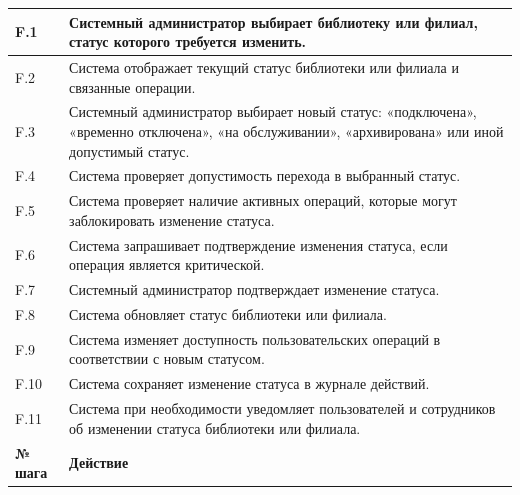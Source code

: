 \documentclass[12pt,a4paper]{article}
\begin{document}
\begin{xltabular}{\textwidth}{
				|>{\raggedright\arraybackslash}p{2.7cm}
				|>{\raggedright\arraybackslash}X|
			}
			F.1 & Системный администратор выбирает библиотеку или филиал, статус
			которого требуется изменить. \\
			\hline
			F.2 & Система отображает текущий статус библиотеки или филиала и связанные
			операции. \\
			\hline
			F.3 & Системный администратор выбирает новый статус: «подключена»,
			«временно отключена», «на обслуживании», «архивирована» или иной
			допустимый статус. \\
			\hline
			F.4 & Система проверяет допустимость перехода в выбранный статус. \\
			\hline
			F.5 & Система проверяет наличие активных операций, которые могут
			заблокировать изменение статуса. \\
			\hline
			F.6 & Система запрашивает подтверждение изменения статуса, если операция
			является критической. \\
			\hline
			F.7 & Системный администратор подтверждает изменение статуса. \\
			\hline
			F.8 & Система обновляет статус библиотеки или филиала. \\
			\hline
			F.9 & Система изменяет доступность пользовательских операций в соответствии
			с новым статусом. \\
			\hline
			F.10 & Система сохраняет изменение статуса в журнале действий. \\
			\hline
			F.11 & Система при необходимости уведомляет пользователей и сотрудников об
			изменении статуса библиотеки или филиала. \\
			\hline
			
			
			\textbf{№ шага} & \textbf{Действие} \\
			\hline
			

\end{xltabular}
\end{document}

